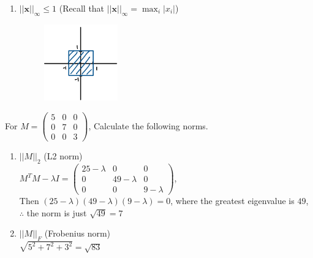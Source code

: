 \documentclass[a4paper]{article}
\theoremstyle{definition}
\newenvironment{soln}{
	\leavevmode\color{blue}\ignorespaces
}{}
\begin{document}
\begin{enumerate}
		\item 	$||\mathbf{x}||_\infty \leq 1$ (Recall that $||\mathbf{x}||_\infty = \max_i |x_i|$)
			\begin{soln}
			\begin{figure}[h!]
			    \centering
			    \includegraphics[width=0.3\textwidth]{images/inf-norm.png}  
			    \captionsetup{labelformat=empty}
			    \caption{}
			    \label{fig:inf-norm}
			\end{figure}
		\end{soln}
	\end{enumerate}
	
	For $M = \begin{pmatrix}
		5 & 0 & 0 \\ 0 & 7 & 0 \\ 0 & 0 & 3
		
	\end{pmatrix}$, Calculate the following norms.
	\begin{enumerate}\addtocounter{enumi}{3}
		\item $||M||_{2}$ (L2 norm) \\
		\begin{soln} $ M^T M -\lambda I = \begin{pmatrix}
		    25 - \lambda & 0 & 0 \\ 0 & 49 - \lambda & 0 \\ 0 & 0 & 9 - \lambda
		\end{pmatrix}$, \\ Then $ (25-\lambda)(49-\lambda)(9-\lambda) = 0$, where the greatest eigenvalue is $ 49 $, \\ $ \therefore $ the norm is just $ \sqrt{49} = 7 $ \end{soln}
		
		\item $||M||_{F}$ (Frobenius norm)\\
		\begin{soln} $ \sqrt{5^2 + 7^2 + 3^2} = \sqrt{83} $ \end{soln}
		
		
	\end{enumerate}
	
\end{document}
